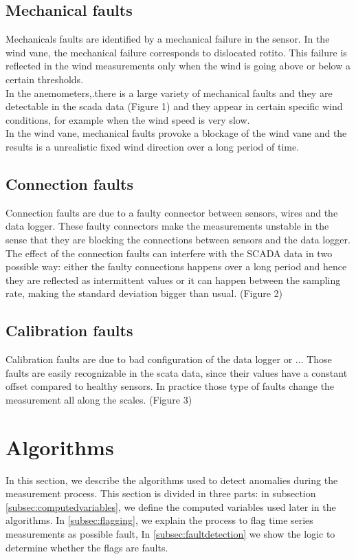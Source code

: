 \documentclass[journal]{IEEEtran}
\begin{document}
\subsection{Mechanical faults} Mechanicals faults are identified by a mechanical failure in the sensor. In the wind vane, the mechanical failure corresponds to dislocated rotito. This failure is reflected in the wind measurements only when the wind is going above or below a certain thresholds.\\
In the anemometers,.there is a large variety of mechanical faults and they are detectable in the scada data (Figure 1) and they appear in certain specific wind conditions, for example when the wind speed is very slow. \\
In the wind vane, mechanical faults provoke a blockage of the wind vane and the results is a unrealistic fixed wind direction over a long period of time.
\subsection{Connection  faults}Connection faults are due to a faulty connector between sensors, wires and the data logger. These faulty connectors make the measurements unstable in the sense that they are blocking the connections between sensors and the data logger. The effect of the connection faults can interfere with the SCADA data in two possible way: either the faulty connections happens over a long period and hence they are reflected as intermittent values or it can happen between the sampling rate, making the standard deviation bigger than usual. (Figure 2) 
\subsection{Calibration faults} 
Calibration faults are due to bad configuration of the data logger or ... Those faults are easily recognizable in the scata data, since their values have a constant offset compared to healthy sensors. In practice those type of faults change the measurement all along the scales. (Figure 3)



\section{Algorithms}\label{sec:algorithms}
In this section, we describe the algorithms used to detect anomalies during the measurement process. This section is divided in three parts: in subsection \ref{subsec:computedvariables}, we define the computed variables used later in the algorithms. In \ref{subsec:flagging}, we explain the process to flag time series measurements as possible fault, In
\ref{subsec:faultdetection} we show the logic to determine whether the flags are faults.  
\end{document}

